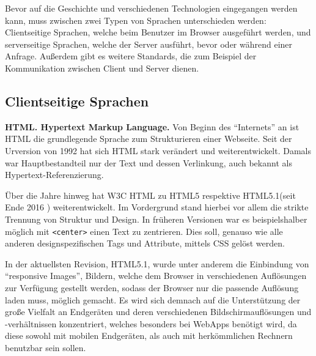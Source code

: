 \documentclass[a4paper,12pt,ngerman,listof=numbered]{scrartcl}      %
\let\oldcite\cite
\renewcommand{\cite}[1]{\textsuperscript{\oldcite{#1}}}
\providecommand{\inlinecode}[1]{\texttt{#1}}
\begin{document}
	Bevor auf die Geschichte und verschiedenen Technologien eingegangen werden kann, muss zwischen zwei Typen von Sprachen unterschieden werden: Clientseitige Sprachen, welche beim Benutzer im Browser ausgeführt werden, und serverseitige Sprachen, welche der Server ausführt, bevor oder während einer Anfrage. Außerdem gibt es weitere Standards, die zum Beispiel der Kommunikation zwischen Client und Server dienen.\par
	
	\subsection{Clientseitige Sprachen}
	
	\textbf{HTML. Hypertext Markup Language.} Von Beginn des ``Internets'' an ist HTML die grundlegende Sprache zum Strukturieren einer Webseite. Seit der Urversion von 1992 hat sich HTML stark verändert und weiterentwickelt. Damals war Hauptbestandteil nur der Text und dessen Verlinkung, auch bekannt als Hyper\-text-Re\-fe\-ren\-zie\-rung.\cite{htmlWiki}\par
	Über die Jahre hinweg hat W3C HTML zu HTML5 respektive HTML5.1(seit Ende 2016 \cite{html51}) weiterentwickelt. Im Vordergrund stand hierbei vor allem die strikte Trennung von Struktur und Design. In früheren Versionen war es beispielshalber möglich mit \inlinecode{<center>} einen Text zu zentrieren. Dies soll, genauso wie alle anderen designspezifischen Tags und Attribute, mittels CSS gelöst werden.\par
	In der aktuellsten Revision, HTML5.1, wurde unter anderem die Einbindung von ``responsive Images'', Bildern, welche dem Browser in verschiedenen Auflösungen zur Verfügung gestellt werden, sodass der Browser nur die passende Auflösung laden muss, möglich gemacht. Es wird sich demnach auf die Unterstützung der große Vielfalt an Endgeräten und deren verschiedenen Bildschirmauflösungen und -verhältnissen konzentriert, welches besonders bei WebApps benötigt wird, da diese sowohl mit mobilen Endgeräten, als auch mit herkömmlichen Rechnern benutzbar sein sollen.\cite{html51blog}\par
	
\end{document}
